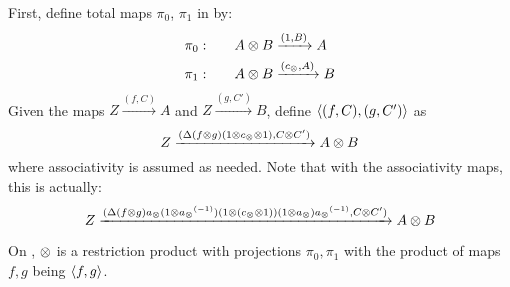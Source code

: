 First, define total maps $\pi_0$, $\pi_1$ in \Xt by:
\begin{align}
  \pi_0:\qquad & A \otimes B \xrightarrow{(1,B)} A \label{eq:defn:pia}\\
  \pi_1:\qquad & A \otimes B \xrightarrow{(c_{\otimes},A)} B \label{eq:defn:pib}
\end{align}
Given the maps $ Z \xrightarrow{(f,C)} A$ and $Z \xrightarrow{(g,C')} B$, define $\langle(f,C),(g,C')\rangle$
as
\begin{equation}
  Z\xrightarrow{(\Delta  ( f \otimes g )  (1\otimes c_{\otimes} \otimes 1), C\otimes C')} A \otimes B\label{eq:defn:fg}
\end{equation}
where associativity is assumed as needed. Note that with the associativity maps, this is actually:
\begin{equation}
  Z\xrightarrow{(\Delta  ( f \otimes g )  a_{\otimes} (1\otimes{a_{\otimes}}^{(-1)})
  (1\otimes (c_{\otimes} \otimes 1)) (1\otimes a_{\otimes}) {a_{\otimes}}^{(-1)}, C\otimes C')} A \otimes B\label{eq:defn:fg2}
\end{equation}
\begin{lemma}\label{lem:tensor_on_x_is_the_restriction_product_on_xt}
  On \Xt, $\otimes$ is a restriction product with projections $\pi_0, \pi_1$ with the product of maps
  $f, g$ being $\langle f,g\rangle$.
\end{lemma}
